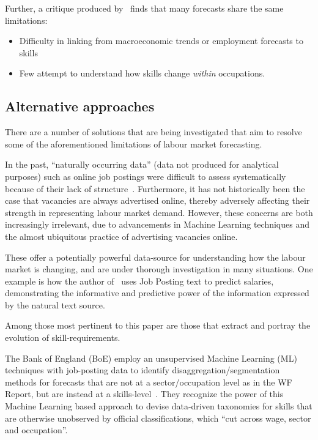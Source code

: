Further, a critique produced by~\cite{ucl_ioe40664} finds that many forecasts share the same limitations:
\begin{itemize}
  \item Difficulty in linking from macroeconomic trends or employment forecasts to skills
  \item Few attempt to understand how skills change \emph{within} occupations.
\end{itemize}

\subsection{Alternative approaches}

There are a number of solutions that are being investigated that aim to resolve some of the aforementioned limitations of labour market forecasting.

In the past, ``naturally occurring data'' (data not produced for analytical purposes) such as online job postings were difficult to assess systematically because of their lack of structure~\cite{dahlhaus_2025_OnlineJob}.
Furthermore, it has not historically been the case that vacancies are always advertised online, thereby adversely affecting their strength in representing labour market demand.
However, these concerns are both increasingly irrelevant, due to advancements in Machine Learning techniques and the almost ubiquitous practice of advertising vacancies online.

These offer a potentially powerful data-source for understanding how the labour market is changing, and are under thorough investigation in many situations.
One example is how the author of~\cite{bana_2021_Job2vecLearning} uses Job Posting text to predict salaries, demonstrating the informative and predictive power of the information expressed by the natural text source.

Among those most pertinent to this paper are those that extract and portray the evolution of skill-requirements.

The Bank of England (BoE) employ an unsupervised Machine Learning (ML) techniques with job-posting data to identify disaggregation/segmentation methods for forecasts that are not at a sector/occupation level as in the WF Report, but are instead at a skills-level~\cite{_2025_UsingOnline}.
They recognize the power of this Machine Learning based approach to devise data-driven taxonomies for skills that are otherwise unobserved by official classifications, which ``cut across wage, sector and occupation''.

